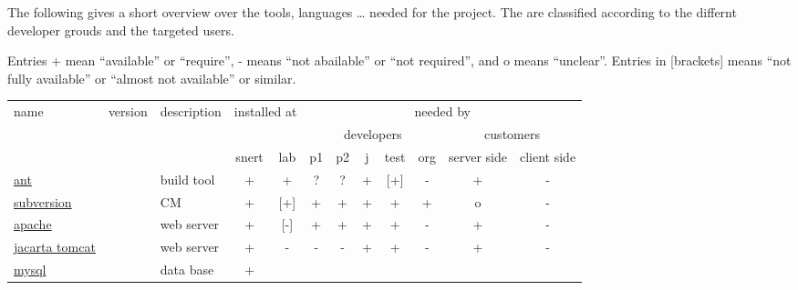 The following gives a short overview over the tools, languages \ldots
needed for the project. The are classified according to the differnt
developer grouds and the targeted users.

Entries + mean ``available'' or ``require'', - means ``not abailable'' or
``not required'', and o means ``unclear''. Entries in [brackets] means
``not fully available'' or ``almost not available'' or similar.




\begin{table}[htbp]
  \centering
  \begin{tabular}[t]{lll|cc|ccccccc|}
    \hline
    name & version & description & \multicolumn{2}{|c|}{installed at} & \multicolumn{7}{|c|}{needed by}
    \\
    &
    &
    &
    &
    &
    \multicolumn{5}{c}{developers}
    &
    \multicolumn{2}{c}{customers}
    \\
    & &
    &
    snert
    &
    lab
    &
    p1
    &
    p2
    &
    j
    &
    test
    &
    org
    &
    server side
    &
    client side
    \\\hline%
    \href{http://ant.apache.org/}{ant} 
    &
    &
    build tool %
    & 
    +  %
    & 
    +  %
    &
    ? %
    &
    ? %
    &
    + %
    &
    [+] %
    & 
    - %
    &
    + %
    &
    - %
    \\
    \href{http://subversion.tigris.org/}{subversion}
    &
    & 
    CM %
    & 
    +  %
    & 
    [+]  %
    &
    + %
    &
    + %
    &
    + %
    &
    + %
    & 
    + %
    &
    o %
    &
    - %
    \\
    \href{http://www.apache.org}{apache}
    &
    & 
    web server %
    & 
    +  %
    & 
    [-]  %
    &
    + %
    &
    + %
    &
    + %
    &
    + %
    & 
    - %
    &
    + %
    &
    - %
    \\
    \href{http://jakarta.apache.org/tomcat/index.html}{jacarta tomcat}
    &
    & 
    web server %
    & 
    +  %
    & 
    -  %
    &
    - %
    &
    - %
    &
    + %
    &
    + %
    & 
    - %
    &
    + %
    &
    - %
    \\
    \href{http://www.mysql.org}{mysql}
    &
    & 
    data base %
    & 
    +  %

\end{tabular}
\end{table}
